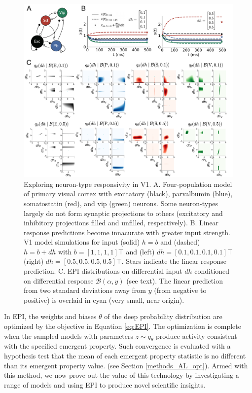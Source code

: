 \documentclass[11pt]{article}
\begin{document}
\begin{figure}
\begin{center}
\includegraphics[scale=0.55]{figures/fig2/fig2.pdf}
\end{center}
\caption{Exploring neuron-type responsivity in V1.  A. Four-population model of primary visual cortex with excitatory (black), parvalbumin (blue), somatostatin (red), and vip (green) neurons.   Some neuron-types largely do not form synaptic projections to others  (excitatory and inhibitory projections filled and unfilled, respectively).  B. Linear response predictions become innacurate with greater input strength.  V1 model simulations for input (solid) $h=b$ and (dashed) $h = b + dh$ with $b = \left[1, 1, 1, 1\right]\top$ and (left) $dh = \left[0.1, 0.1, 0.1, 0.1\right]\top$ (right) $dh = \left[0.5, 0.5, 0.5, 0.5\right]\top$.  Stars indicate the linear response prediction.  C. EPI distributions on differential input $dh$ conditioned on differential response $\mathcal{B}(\alpha, y)$ (see text). The linear prediction from two standard deviations away from $y$ (from negative to positive) is overlaid in cyan (very small, near origin). }
\end{figure}

In EPI, the weights and biases $\theta$ of the deep probability distribution are optimized by the objective in Equation \ref{eq:EPI}. The optimization is complete when the sampled models with parameters $z \sim q_\theta$ produce activity consistent with the specified emergent property.  Such convergence is evaluated with a hypothesis test that the mean of each emergent property statistic is no different than its emergent property value. (see Section \ref{methods_AL_opt}). Armed with this method, we now prove out the value of this technology by investigating a range of models and using EPI to produce novel scientific insights.
\end{document}
